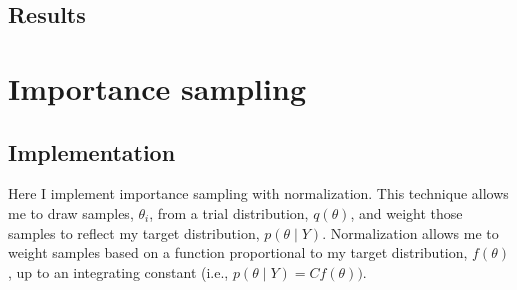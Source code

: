 \documentclass{article}
\begin{document}
\subsection*{Results}


\section{Importance sampling}
\subsection*{Implementation}
Here I implement importance sampling with normalization. This technique allows me to draw samples, $\theta_i$, from a trial distribution, $q(\theta)$, and weight those samples to reflect my target distribution, $p(\theta \mid Y)$. Normalization allows me to weight samples based on a function proportional to my target distribution, $f(\theta)$, up to an integrating constant (i.e., $p(\theta \mid Y) = Cf(\theta))$.
\end{document}
